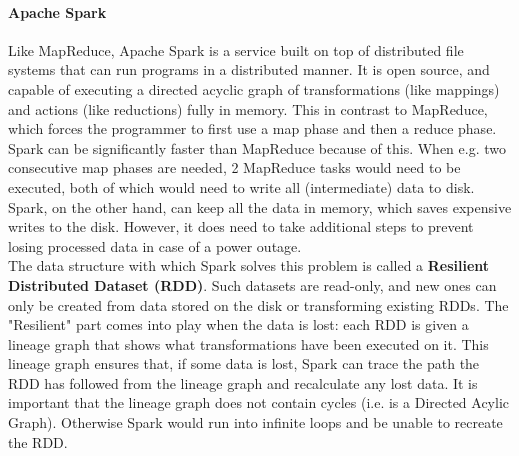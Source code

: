 \paragraph{Apache Spark}
Like MapReduce, Apache Spark is a service built on top of distributed file systems that can run programs in a distributed manner. It is open source, and capable of executing a directed acyclic graph of transformations (like mappings) and actions (like reductions) fully in memory\cite{Sparkwebsite}. This in contrast to MapReduce, which forces the programmer to first use a map phase and then a reduce phase. Spark can be significantly faster than MapReduce because of this. When e.g. two consecutive map phases are needed, 2 MapReduce tasks would need to be executed, both of which would need to write all (intermediate) data to disk. Spark, on the other hand, can keep all the data in memory, which saves expensive writes to the disk. However, it does need to take additional steps to prevent losing processed data in case of a power outage.\\

The data structure with which Spark solves this problem is called a \textbf{Resilient Distributed Dataset (RDD)}. Such datasets are read-only, and new ones can only be created from data stored on the disk or transforming existing RDDs\cite{Zaha12}. The "Resilient" part comes into play when the data is lost: each RDD is given a lineage graph that shows what transformations have been executed on it. This lineage graph ensures that, if some data is lost, Spark can trace the path the RDD has followed from the lineage graph and recalculate any lost data. It is important that the lineage graph does not contain cycles (i.e. is a Directed Acylic Graph). Otherwise Spark would run into infinite loops and be unable to recreate the RDD.
